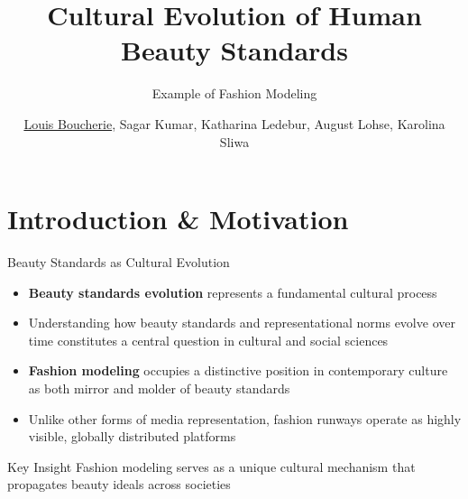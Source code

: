 \documentclass[aspectratio=169,xcolor=dvipsnames,10pt]{beamer}
\title{Cultural Evolution of Human Beauty Standards}
\subtitle{Example of Fashion Modeling}
\author{ \hspace{0.1em}\underline{Louis Boucherie}, Sagar Kumar, Katharina Ledebur, August Lohse, Karolina Sliwa}
\begin{document}
\begin{frame}
    \titlepage
\end{frame}


\section{Introduction \& Motivation}

\begin{frame}{Beauty Standards as Cultural Evolution}
    \begin{itemize}
        \item \textbf{Beauty standards evolution} represents a fundamental cultural process
        \pause \item Understanding how beauty standards and representational norms evolve over time constitutes a central question in cultural and social sciences
        \pause \item  \textbf{Fashion modeling} occupies a distinctive position in contemporary culture as both mirror and molder of beauty standards
        \pause\item Unlike other forms of media representation, fashion runways operate as highly visible, globally distributed platforms
    \end{itemize}
    
    \pause \begin{block}{Key Insight}
        Fashion modeling serves as a unique cultural mechanism that propagates beauty ideals across societies
    \end{block}
\end{frame}

        
        
\end{document}
